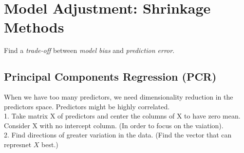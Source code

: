 \documentclass[11pt,a4paper]{article}
\begin{document}
\section{ Model Adjustment: Shrinkage Methods}
Find a \textit{trade-off} between \textit{model bias} and \textit{prediction error}.
\subsection{ Principal Components Regression (PCR)}
When we have too many predictors, we need dimensionality reduction in the predictors space. Predictors might be highly correlated.\\
1. Take matrix X of predictors and center the columns of X to have zero mean. Consider X with no intercept column. (In order to focus on the vaiation).\\
2. Find directions of greater variation in the data. (Find the vector that can represnet $X$ best.)
\end{document}
